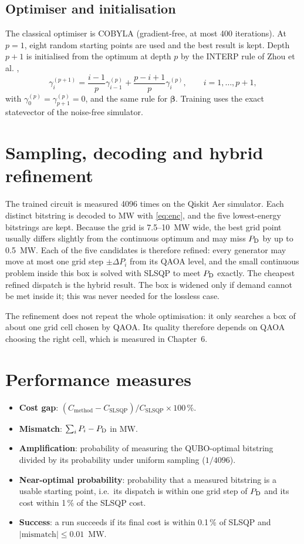 \subsection{Optimiser and initialisation}
The classical optimiser is COBYLA (gradient-free, at most 400 iterations). At $p = 1$, eight random starting points are used and the best result is kept. Depth $p + 1$ is initialised from the optimum at depth $p$ by the INTERP rule of Zhou et al. \cite{zhou2020},
\begin{equation}
\gamma^{(p+1)}_i = \frac{i-1}{p}\gamma^{(p)}_{i-1} + \frac{p-i+1}{p}\gamma^{(p)}_{i}, \qquad i = 1,\dots,p+1,
\end{equation}
with $\gamma^{(p)}_0 = \gamma^{(p)}_{p+1} = 0$, and the same rule for $\boldsymbol\beta$. Training uses the exact statevector of the noise-free simulator.

\section{Sampling, decoding and hybrid refinement}
The trained circuit is measured 4096 times on the Qiskit Aer simulator. Each distinct bitstring is decoded to MW with \eqref{eq:enc}, and the five lowest-energy bitstrings are kept. Because the grid is 7.5--10~MW wide, the best grid point usually differs slightly from the continuous optimum and may miss $P_{\mathrm{D}}$ by up to 0.5~MW. Each of the five candidates is therefore refined: every generator may move at most one grid step $\pm\Delta P_i$ from its QAOA level, and the small continuous problem inside this box is solved with SLSQP to meet $P_{\mathrm{D}}$ exactly. The cheapest refined dispatch is the hybrid result. The box is widened only if demand cannot be met inside it; this was never needed for the lossless case.

The refinement does not repeat the whole optimisation: it only searches a box of about one grid cell chosen by QAOA. Its quality therefore depends on QAOA choosing the right cell, which is measured in Chapter~6.

\section{Performance measures}
\begin{itemize}
\item \textbf{Cost gap}: $(C_{\text{method}} - C_{\text{SLSQP}})/C_{\text{SLSQP}} \times 100\,\%$.
\item \textbf{Mismatch}: $\sum_i P_i - P_{\mathrm{D}}$ in MW.
\item \textbf{Amplification}: probability of measuring the QUBO-optimal bitstring divided by its probability under uniform sampling ($1/4096$).
\item \textbf{Near-optimal probability}: probability that a measured bitstring is a usable starting point, i.e.\ its dispatch is within one grid step of $P_{\mathrm{D}}$ and its cost within 1\,\% of the SLSQP cost.
\item \textbf{Success}: a run succeeds if its final cost is within 0.1\,\% of SLSQP and $|\text{mismatch}| \le 0.01$~MW.
\end{itemize}
